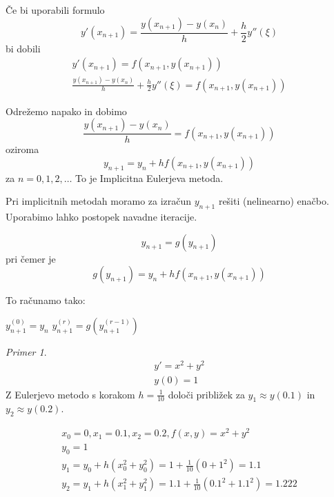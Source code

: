 \documentclass[a4paper,12pt]{article}
\theoremstyle{definition}
\theoremstyle{remark}
\newtheorem*{ex}{Primer}
\begin{document}
Če bi uporabili formulo
\begin{equation*}
    y'(x_{n+1}) = \frac{y(x_{n+1})-y(x_n)}{h} + \frac{h}{2} y''(\xi)
\end{equation*}
bi dobili
\begin{gather*}
    y'(x_{n+1}) = f(x_{n+1}, y(x_{n+1})) \\
    \frac{y(x_{n+1})-y(x_n)}{h} + \frac{h}{2} y''(\xi) = f(x_{n+1}, y(x_{n+1}))
\end{gather*}

Odrežemo napako in dobimo
\begin{equation*}
    \frac{y(x_{n+1})-y(x_n)}{h} = f(x_{n+1}, y(x_{n+1}))
\end{equation*}
oziroma
\begin{equation*}
    y_{n+1} = y_n + h f(x_{n+1}, y(x_{n+1}))
\end{equation*}
za $n = 0, 1, 2, \dots$ To je Implicitna Eulerjeva metoda.

Pri implicitnih metodah moramo za izračun $y_{n+1}$ rešiti (nelinearno) enačbo. Uporabimo lahko postopek navadne iteracije.

\begin{equation*}
    y_{n+1} = g(y_{n+1})
\end{equation*}
pri čemer je
\begin{equation*}
    g(y_{n+1}) = y_n + h f(x_{n+1}, y(x_{n+1}))
\end{equation*}

To računamo tako:
\begin{algorithmic}
    \State $y_{n+1}^{(0)} = y_n$
    \Do
        \State $y_{n+1}^{(r)} = g(y_{n+1}^{(r-1)})$
\end{algorithmic}



\begin{ex}
    \begin{gather*}
        y' = x^2 + y^2 \\
        y(0) = 1
    \end{gather*}
    Z Eulerjevo metodo s korakom $h = \frac{1}{10}$ določi približek za $y_1 \approx y(0.1)$ in $y_2 \approx y(0.2)$.

    \begin{gather*}
        x_0 = 0, x_1 = 0.1, x_2 = 0.2, f(x, y) = x^2 + y^2 \\
        y_0 = 1 \\
        y_1 = y_0 + h(x_0^2 + y_0^2) = 1 + \frac{1}{10}(0 + 1^2) = 1.1 \\
        y_2 = y_1 + h(x_1^2 + y_1^2) = 1.1 + \frac{1}{10}(0.1^2 + 1.1^2) = 1.222
    \end{gather*}
\end{ex}
\end{document}
